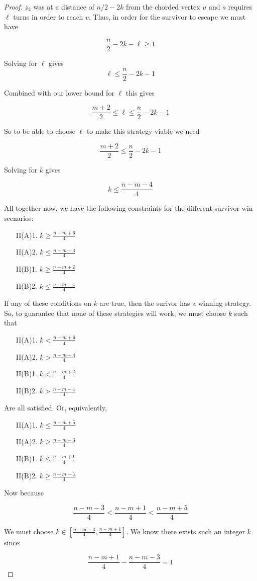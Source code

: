 \documentclass[letterpaper, 10pt]{article}
\begin{document}
\begin{proof}
$z_2$ was at a distance of $n/2-2k$ from the chorded vertex $u$ and $s$ requires
$\ell$ turns in order to reach $v$. Thus, in order for the survivor to escape
we must have

\[ \frac{n}{2} -2k - \ell \geq 1 \]

Solving for $\ell$ gives
\[ \ell \leq \frac{n}{2} -2k -1 \]

Combined with our lower bound for $\ell$ this gives

\[ \frac{m+2}{2} \leq \ell \leq \frac{n}{2} -2k -1 \]

So to be able to choose $\ell$ to make this strategy viable we need

\[ \frac{m+2}{2} \leq \frac{n}{2} -2k -1 \]

Solving for $k$ gives

\[ k \leq \frac{n-m-4}{4} \]

All together now, we have the following constraints for the different survivor-win scenarios:

\begin{itemize}
\item[II(A)1.] $k \geq \frac{n-m+6}{4}$
\item[II(A)2.] $k \leq \frac{n-m-4}{4}$
\item[II(B)1.] $k \geq \frac{n-m+2}{4}$
\item[II(B)2.] $k \leq \frac{n-m-4}{4}$

\end{itemize}

If any of these conditions on $k$ are true, then the surivor has a winning strategy.
So, to guarantee that none of these strategies will work, we must choose $k$ such that

\begin{itemize}
\item[II(A)1.] $k < \frac{n-m+6}{4}$
\item[II(A)2.] $k > \frac{n-m-4}{4}$
\item[II(B)1.] $k < \frac{n-m+2}{4}$
\item[II(B)2.] $k > \frac{n-m-4}{4}$
\end{itemize}

Are all satisfied. Or, equivalently,

\begin{itemize}
\item[II(A)1.] $k \leq \frac{n-m+5}{4}$
\item[II(A)2.] $k \geq \frac{n-m-3}{4}$
\item[II(B)1.] $k \leq \frac{n-m+1}{4}$
\item[II(B)2.] $k \geq \frac{n-m-3}{4}$
\end{itemize}

Now because

\[ \frac{n-m-3}{4} < \frac{n-m+1}{4} < \frac{n-m+5}{4} \]

We must choose $k \in [\frac{n-m-3}{4}, \frac{n-m+1}{4}]$. We know there exists
such an integer $k$ since:

\[ \frac{n-m+1}{4} - \frac{n-m-3}{4} = 1 \]



\end{proof}
\end{document}
